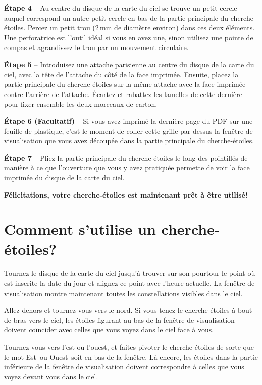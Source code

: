 \documentclass[a4paper,onecolumn,10pt]{article}
\begin{document}
{\bf Étape 4} -- Au centre du disque de la carte du ciel se trouve un petit cercle auquel correspond un autre petit cercle en bas de la partie principale du cherche-étoiles. Percez un petit trou (2\,mm de diamètre environ) dans ces deux éléments. Une perforatrice est l’outil idéal si vous en avez une, sinon utilisez une pointe de compas et agrandissez le trou par un mouvement circulaire.

{\bf Étape 5} -- Introduisez une attache parisienne au centre du disque de la carte du ciel, avec la tête de l’attache du côté de la face imprimée. Ensuite, placez la partie principale du cherche-étoiles sur la même attache avec la face imprimée contre l’arrière de l’attache. Écartez et rabattez les lamelles de cette dernière pour fixer ensemble les deux morceaux de carton.

{\bf Étape 6 (Facultatif)} -- Si vous avez imprimé la dernière page du PDF sur une feuille de plastique, c’est le moment de coller cette grille par-dessus la fenêtre de visualisation que vous avez découpée dans la partie principale du cherche-étoiles.

{\bf Étape 7} -- Pliez la partie principale du cherche-étoiles le long des pointillés de manière à ce que l’ouverture que vous y avez pratiquée permette de voir la face imprimée du disque de la carte du ciel.


{\bf Félicitations, votre cherche-étoiles est maintenant prêt à être utilisé!}

\section*{Comment s’utilise un cherche-étoiles?}

Tournez le disque de la carte du ciel jusqu’à trouver sur son pourtour le point où est inscrite la date du jour et alignez ce point avec l’heure actuelle. La fenêtre de visualisation montre maintenant toutes les constellations visibles dans le ciel.

Allez dehors et tournez-vous vers le nord. Si vous tenez le cherche-étoiles à bout de bras vers le ciel, les étoiles figurant au bas de la fenêtre de visualisation doivent coïncider avec celles que vous voyez dans le ciel face à vous.

Tournez-vous vers l’est ou l’ouest, et faites pivoter le cherche-étoiles de sorte que le mot \guillemotleft Est\guillemotright\ ou \guillemotleft Ouest\guillemotright\ soit en bas de la fenêtre. Là encore, les étoiles dans la partie inférieure de la fenêtre de visualisation doivent correspondre à celles que vous voyez devant vous dans le ciel. 
\end{document}
